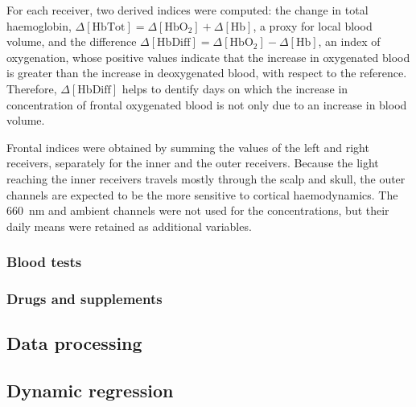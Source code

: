 \documentclass[11pt,a4paper]{article}
\begin{document}
For each receiver, two derived indices were computed: the change in total haemoglobin,
$\Delta[\mathrm{HbTot}] = \Delta[\mathrm{HbO_2}] + \Delta[\mathrm{Hb}]$, a proxy for
local blood volume, and the difference
$\Delta[\mathrm{HbDiff}] = \Delta[\mathrm{HbO_2}] - \Delta[\mathrm{Hb}]$, an index of
oxygenation, whose positive values indicate that the increase in oxygenated blood is
greater than the increase in deoxygenated blood, with respect to the reference. Therefore,
$\Delta[\mathrm{HbDiff}]$ helps to dentify days on which the increase in concentration of
frontal oxygenated blood is not only due to an increase in blood volume.

Frontal indices were obtained by summing the values of the left and right receivers,
separately for the inner and the outer receivers. Because the light reaching the inner
receivers travels mostly through the scalp and skull, the outer channels are expected
to be the more sensitive to cortical haemodynamics. The \SI{660}{\nano\metre} and
ambient channels were not used for the concentrations, but their daily means were
retained as additional variables.

\subsubsection{Blood tests}

\subsubsection{Drugs and supplements}


\subsection{Data processing}\label{sec:processing}

\subsection{Dynamic regression}\label{sec:dynareg}
\end{document}
